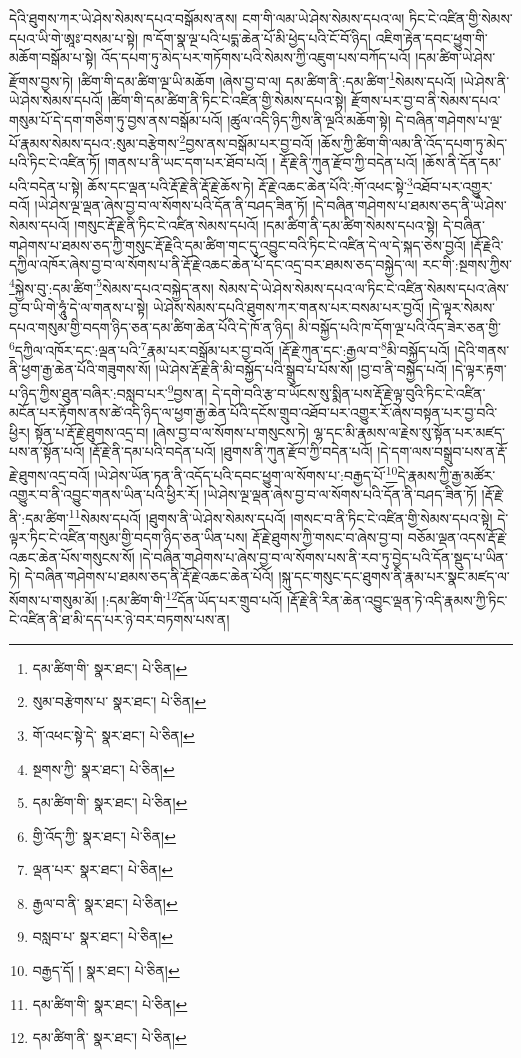 དེའི་ཐུགས་ཀར་ཡེ་ཤེས་སེམས་དཔའ་བསྒོམས་ནས། ངག་གི་ལམ་ཡེ་ཤེས་སེམས་དཔའ་ལ། ཏིང་ངེ་འཛིན་གྱི་སེམས་དཔའ་ཡི་གེ་ཨཱཿ་བསམ་པ་སྟེ། ཁ་དོག་སྣ་ལྔ་པའི་པདྨ་ཆེན་པོ་མི་ཕྱེད་པའི་ངོ་བོ་ཉིད། འཇིག་རྟེན་དབང་ཕྱུག་གི་མཆོག་བསྒོམ་པ་སྟེ། འོད་དཔག་ཏུ་མེད་པར་གཏོགས་པའི་སེམས་ཀྱི་འཇུག་པས་བཀོད་པའོ། །དམ་ཚིག་ཡེ་ཤེས་རྫོགས་བྱས་ཏེ། །ཚིག་གི་དམ་ཚིག་ལྔ་ཡི་མཆོག །ཞེས་བྱ་བ་ལ། དམ་ཚིག་ནི་:དམ་ཚིག་\footnote{དམ་ཚིག་གི་  སྣར་ཐང་།  པེ་ཅིན། }སེམས་དཔའོ། །ཡེ་ཤེས་ནི་ཡེ་ཤེས་སེམས་དཔའོ། །ཚིག་གི་དམ་ཚིག་ནི་ཏིང་ངེ་འཛིན་གྱི་སེམས་དཔའ་སྟེ། རྫོགས་པར་བྱ་བ་ནི་སེམས་དཔའ་གསུམ་པོ་དེ་དག་གཅིག་ཏུ་བྱས་ནས་བསྒོམ་པའོ། །ཚུལ་འདི་ཉིད་ཀྱིས་ནི་ལྔའི་མཆོག་སྟེ། དེ་བཞིན་གཤེགས་པ་ལྔ་པོ་རྣམས་སེམས་དཔའ་:སུམ་བརྩེགས་\footnote{སུམ་བརྩེགས་པ་  སྣར་ཐང་།  པེ་ཅིན། }བྱས་ནས་བསྒོམ་པར་བྱ་བའོ། །ཆོས་ཀྱི་ཚིག་གི་ལམ་ནི་འོད་དཔག་ཏུ་མེད་པའི་ཏིང་ངེ་འཛིན་ཏོ། །གནས་པ་ནི་ཡང་དག་པར་ཐོབ་པའོ། །
རྡོ་རྗེ་ནི་ཀུན་རྫོབ་ཀྱི་བདེན་པའོ། །ཆོས་ནི་དོན་དམ་པའི་བདེན་པ་སྟེ། ཆོས་དང་ལྡན་པའི་རྡོ་རྗེ་ནི་རྡོ་རྗེ་ཆོས་ཏེ། རྡོ་རྗེ་འཆང་ཆེན་པོའི་:གོ་འཕང་སྟེ་\footnote{གོ་འཕང་སྟེ་དེ་  སྣར་ཐང་།  པེ་ཅིན། }འཐོབ་པར་འགྱུར་བའོ། །ཡེ་ཤེས་ལྔ་ལྡན་ཞེས་བྱ་བ་ལ་སོགས་པའི་དོན་ནི་བཤད་ཟིན་ཏོ། །དེ་བཞིན་གཤེགས་པ་ཐམས་ཅད་ནི་ཡེ་ཤེས་སེམས་དཔའོ། །གསུང་རྡོ་རྗེ་ནི་ཏིང་ངེ་འཛིན་སེམས་དཔའོ། །དམ་ཚིག་ནི་དམ་ཚིག་སེམས་དཔའ་སྟེ། དེ་བཞིན་གཤེགས་པ་ཐམས་ཅད་ཀྱི་གསུང་རྡོ་རྗེའི་དམ་ཚིག་གང་དུ་འབྱུང་བའི་ཏིང་ངེ་འཛིན་དེ་ལ་དེ་སྐད་ཅེས་བྱའོ། །རྡོ་རྗེའི་དཀྱིལ་འཁོར་ཞེས་བྱ་བ་ལ་སོགས་པ་ནི་རྡོ་རྗེ་འཆང་ཆེན་པོ་དང་འདྲ་བར་ཐམས་ཅད་བསྐྱེད་ལ། རང་གི་:སྔགས་ཀྱིས་\footnote{སྔགས་ཀྱི་  སྣར་ཐང་།  པེ་ཅིན། }སྐྱེས་བུ་:དམ་ཚིག་\footnote{དམ་ཚིག་གི་  སྣར་ཐང་།  པེ་ཅིན། }སེམས་དཔའ་བསྐྱེད་ནས། སེམས་དེ་ཡེ་ཤེས་སེམས་དཔའ་ལ་ཏིང་ངེ་འཛིན་སེམས་དཔའ་ཞེས་བྱ་བ་ཡི་གེ་ཧཱུཾ་དེ་ལ་གནས་པ་སྟེ། ཡེ་ཤེས་སེམས་དཔའི་ཐུགས་ཀར་གནས་པར་བསམ་པར་བྱའོ། །དེ་ལྟར་སེམས་དཔའ་གསུམ་གྱི་བདག་ཉིད་ཅན་དམ་ཚིག་ཆེན་པོའི་དེ་ཁོ་ན་ཉིད། མི་བསྐྱོད་པའི་ཁ་དོག་ལྔ་པའི་འོད་ཟེར་ཅན་གྱི་\footnote{གྱི་འོད་ཀྱི་  སྣར་ཐང་།  པེ་ཅིན། }དཀྱིལ་འཁོར་དང་:ལྡན་པའི་\footnote{ལྡན་པར་  སྣར་ཐང་།  པེ་ཅིན། }རྣམ་པར་བསྒོམ་པར་བྱ་བའོ། །རྡོ་རྗེ་ཀུན་དང་:རྒྱལ་བ་\footnote{རྒྱལ་བ་ནི་  སྣར་ཐང་།  པེ་ཅིན། }མི་བསྐྱོད་པའོ། །དེའི་གནས་ནི་ཕྱག་རྒྱ་ཆེན་པོའི་གཟུགས་སོ། །ཡེ་ཤེས་རྡོ་རྗེ་ནི་མི་བསྐྱོད་པའི་སྒྲུབ་པ་པོས་སོ། །བྱ་བ་ནི་བསྐྱེད་པའོ། །དེ་ལྟར་རྟག་པ་ཉིད་ཀྱིས་ཐུན་བཞིར་:བསླབ་པར་\footnote{བསླབ་པ་  སྣར་ཐང་།  པེ་ཅིན། }བྱས་ན། དེ་དགེ་བའི་རྩ་བ་ཡོངས་སུ་སྨིན་པས་རྡོ་རྗེ་ལྟ་བུའི་ཏིང་ངེ་འཛིན་མངོན་པར་རྟོགས་ནས་ཚེ་འདི་ཉིད་ལ་ཕྱག་རྒྱ་ཆེན་པོའི་དངོས་གྲུབ་འཐོབ་པར་འགྱུར་རོ་ཞེས་བསྟན་པར་བྱ་བའི་ཕྱིར། སྟོན་པ་རྡོ་རྗེ་ཐུགས་འདྲ་བ། །ཞེས་བྱ་བ་ལ་སོགས་པ་གསུངས་ཏེ། ལྷ་དང་མི་རྣམས་ལ་རྗེས་སུ་སྟོན་པར་མཛད་པས་ན་སྟོན་པའོ། །རྡོ་རྗེ་ནི་དམ་པའི་བདེན་པའོ། །ཐུགས་ནི་ཀུན་རྫོབ་ཀྱི་བདེན་པའོ། །དེ་དག་ལས་བསྒྲུབ་པས་ན་རྡོ་རྗེ་ཐུགས་འདྲ་བའོ། །ཡེ་ཤེས་ཡོན་ཏན་ནི་འདོད་པའི་དབང་ཕྱུག་ལ་སོགས་པ་:བརྒྱད་པོ་\footnote{བརྒྱད་དོ། །  སྣར་ཐང་།  པེ་ཅིན། }དེ་རྣམས་ཀྱི་རྒྱ་མཚོར་འགྱུར་བ་ནི་འབྱུང་གནས་ཡིན་པའི་ཕྱིར་རོ། །ཡེ་ཤེས་ལྔ་ལྡན་ཞེས་བྱ་བ་ལ་སོགས་པའི་དོན་ནི་བཤད་ཟིན་ཏོ། །རྡོ་རྗེ་ནི་:དམ་ཚིག་\footnote{དམ་ཚིག་གི་  སྣར་ཐང་།  པེ་ཅིན། }སེམས་དཔའོ། །ཐུགས་ནི་ཡེ་ཤེས་སེམས་དཔའོ། །གསང་བ་ནི་ཏིང་ངེ་འཛིན་གྱི་སེམས་དཔའ་སྟེ། དེ་ལྟར་ཏིང་ངེ་འཛིན་གསུམ་གྱི་བདག་ཉིད་ཅན་ཡིན་པས། རྡོ་རྗེ་ཐུགས་ཀྱི་གསང་བ་ཞེས་བྱ་བ། བཅོམ་ལྡན་འདས་རྡོ་རྗེ་འཆང་ཆེན་པོས་གསུངས་སོ། །དེ་བཞིན་གཤེགས་པ་ཞེས་བྱ་བ་ལ་སོགས་པས་ནི་རབ་ཏུ་བྱེད་པའི་དོན་སྡུད་པ་ཡིན་ཏེ། དེ་བཞིན་གཤེགས་པ་ཐམས་ཅད་ནི་རྡོ་རྗེ་འཆང་ཆེན་པོའོ། །སྐུ་དང་གསུང་དང་ཐུགས་ནི་རྣམ་པར་སྣང་མཛད་ལ་སོགས་པ་གསུམ་མོ། །:དམ་ཚིག་གི་\footnote{དམ་ཚིག་ནི་  སྣར་ཐང་།  པེ་ཅིན། }དོན་ཡོད་པར་གྲུབ་པའོ། །རྡོ་རྗེ་ནི་རིན་ཆེན་འབྱུང་ལྡན་ཏེ་འདི་རྣམས་ཀྱི་ཏིང་ངེ་འཛིན་ནི་ཐ་མི་དད་པར་ཉེ་བར་བཏགས་པས་ན། 